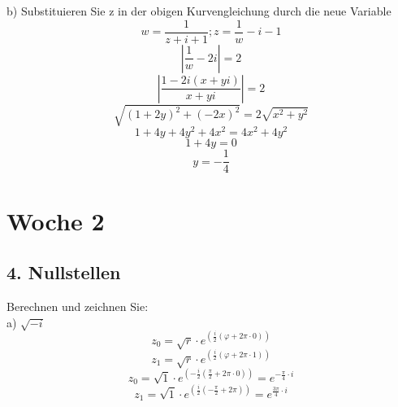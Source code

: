 \documentclass{article}
\begin{document}
    b)  Substituieren Sie z in der obigen Kurvengleichung durch die neue Variable
    \begin{equation*}
        w=\frac{1}{z+i+1}; z=\frac{1}{w}-i-1
    \end{equation*}
    \begin{equation*}
        |\frac{1}{w}-2i|=2
    \end{equation*}
    \begin{equation*}
        |\frac{1-2i(x+yi)}{x+yi}|=2
    \end{equation*}
     \begin{equation*}
        \sqrt{\left(1+2y\right)^2+{\left(-2x\right)^2}} =2\sqrt{x^2+y^2}
     \end{equation*}
     \begin{equation*}
        1+4y+4y^2+4x^2=4x^2+4y^2
     \end{equation*}
     \begin{equation*}
        1+4y=0
     \end{equation*}
     \begin{equation*}
        y=-\frac{1}{4}
     \end{equation*}

     \section{Woche 2}

     \subsection{4. Nullstellen}
     Berechnen und zeichnen Sie:\\
     a) $\sqrt{-i}$
     \begin{equation*}
        z_0 = \sqrt{r}\cdot e^{\left(\frac{i}{2}\left(\varphi + 2 \pi \cdot 0\right)\right)}
     \end{equation*}
     \begin{equation*}
        z_1 = \sqrt{r} \cdot e^{\left(\frac{i}{2}\left(\varphi + 2 \pi \cdot 1\right)\right)}
     \end{equation*}
     \begin{equation*}
        z_0 = \sqrt{1} \cdot e^{\left(-\frac{i}{2}\left(\frac{\pi}{2} + 2 \pi \cdot 0\right)\right)} = e^{-\frac{\pi}{4} \cdot i}
     \end{equation*}
     \begin{equation*}
        z_1 = \sqrt{1} \cdot e^{\left(\frac{i}{2}\left(-\frac{\pi}{2} + 2 \pi\right)\right)} = e^{\frac{3\pi}{4}\cdot i}
     \end{equation*}
\end{document}
